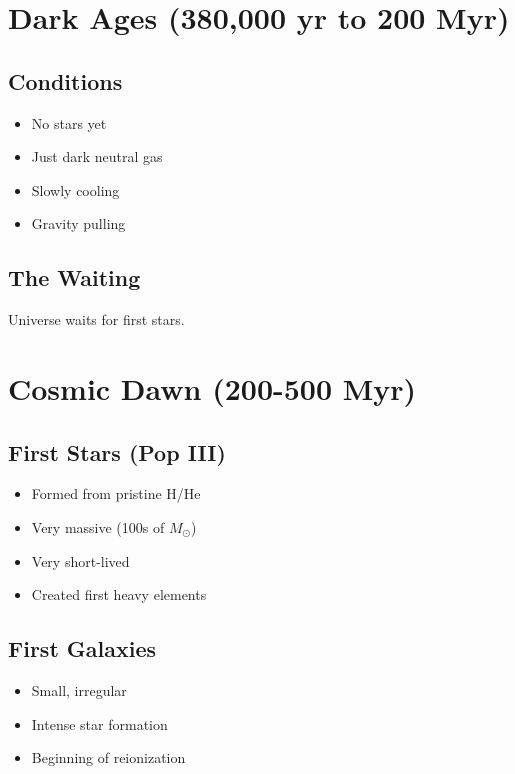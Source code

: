 \documentclass[
  11pt,
  letterpaper,
  twoside,
  openright]{book}
\providecommand{\tightlist}{%
  \setlength{\itemsep}{0pt}\setlength{\parskip}{0pt}}
\begin{document}
\section{Dark Ages (380,000 yr to 200
Myr)}\label{dark-ages-380000-yr-to-200-myr}

\subsection{Conditions}\label{conditions-4}

\begin{itemize}
\tightlist
\item
  No stars yet
\item
  Just dark neutral gas
\item
  Slowly cooling
\item
  Gravity pulling
\end{itemize}

\subsection{The Waiting}\label{the-waiting}

Universe waits for first stars.

\section{Cosmic Dawn (200-500 Myr)}\label{cosmic-dawn-200-500-myr}

\subsection{First Stars (Pop III)}\label{first-stars-pop-iii}

\begin{itemize}
\tightlist
\item
  Formed from pristine H/He
\item
  Very massive (100s of \(M_\odot\))
\item
  Very short-lived
\item
  Created first heavy elements
\end{itemize}

\subsection{First Galaxies}\label{first-galaxies}

\begin{itemize}
\tightlist
\item
  Small, irregular
\item
  Intense star formation
\item
  Beginning of reionization
\end{itemize}
\end{document}
